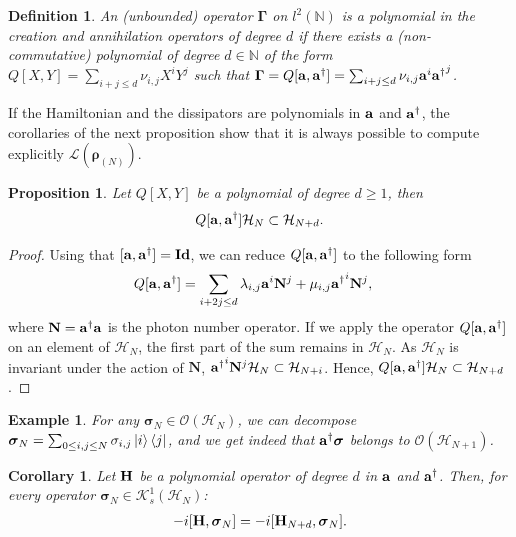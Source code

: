\documentclass[a4paper,onecolumn,amsmath,amssymb,amsfonts,accepted=2026-03-06]{quantumarticle}
\newcommand{\xL}{\mathcal{L}}
\newcommand{\Id}{\operatorname{\mathbf{Id}}}
\newcommand{\xH}{\mathcal{H}}
\newcommand{\xK}{\mathcal{K}}
\newcommand{\xN}{\mathbb{N}}
\newcommand{\LL}{{\mathbf{\Gamma}}}
\newcommand{\Hamil}{{\bf H}}
\newcommand{\destroy}{{\bf a}}
\newcommand{\create}{{\bf a^\dag}}
\newcommand{\rN}{{\boldsymbol{\rho}_{(N)}}}
\newcommand{\Nop}{\mathbf{N}}
\newtheorem{definition}{Definition}
\newtheorem{proposition}{Proposition}
\newtheorem{corollary}{Corollary}
\newtheorem{example}{Example}
\begin{document}
\begin{definition}
    An (unbounded) operator $\LL$ on $l^2(\xN)$ is a polynomial in the creation and annihilation operators of degree $d$ if there exists a (non-commutative) polynomial of degree $d\in \xN$ of the form ${Q}[X, Y]=\sum_{i+j\leq d}\nu_{i,j}X^iY^j$ such that $\LL={Q}[\destroy, \create]=\sum_{i+j\leq d}\nu_{i,j}\destroy^i \create^j$.
\end{definition}
If the Hamiltonian and the dissipators are polynomials in $\destroy$ and $\create$, the corollaries of the next proposition show that it is always possible to compute explicitly $\xL(\rN)$.
\begin{proposition}
    \label{proposition:polyink}
    Let ${Q}[X, Y]$ be a polynomial of degree $d\geq 1$, then
    \begin{align}
       {Q}[\destroy, \create] \xH_N \subset \xH_{N+d}.
    \end{align}
\end{proposition}
\begin{proof}
    Using that $[\destroy,\create]=\Id$, we can reduce ${Q}[\destroy, \create]$ to the following form
    \begin{align}
        {Q}[\destroy, \create]&= \sum_{i+2j \leq d} \lambda_{i,j} \destroy^i \Nop^j + \mu_{i,j}  \create^i \Nop^j,
    \end{align}
    where $\Nop=\create \destroy$ is the photon number operator. If we apply the operator ${Q}[\destroy, \create]$ on an element of $\xH_N$, the first part of the sum remains in $\xH_N$. As $\xH_N$ is invariant under the action of $\Nop$, $\create^i \Nop^j \xH_N \subset \xH_{N+i}$. Hence, ${Q}[\destroy, \create] \xH_N \subset \xH_{N+d}$.
\end{proof}
\begin{example}
    For any $\boldsymbol{\sigma}_N \in \mathcal{O}(\xH_N)$, we can decompose $\boldsymbol{\sigma}_N=\sum_{0\leq i,j\leq N} \sigma_{i,j} \ket{i}\bra{j}$, and we get indeed that $\create \boldsymbol{\sigma}$ belongs to $\mathcal{O}(\xH_{N+1})$.
\end{example}
\begin{corollary}
    \label{co:Hamiltonian}
    Let $\Hamil$ be a polynomial operator of degree $d$ in $\destroy$ and $\create$. Then, for every operator $\boldsymbol{\sigma}_N\in \xK_s^1(\xH_N)$:
    \begin{align}
        -i[\Hamil,\boldsymbol{\sigma}_N]=-i[\Hamil_{N+d},\boldsymbol{\sigma}_N].
    \end{align}
\end{corollary}
\end{document}
